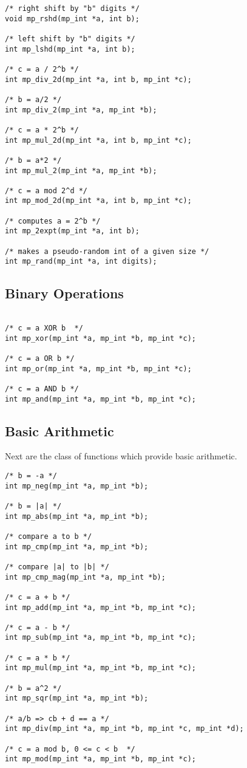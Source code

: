 \documentclass[]{article}
\begin{document}
\begin{verbatim}
/* right shift by "b" digits */
void mp_rshd(mp_int *a, int b);

/* left shift by "b" digits */
int mp_lshd(mp_int *a, int b);

/* c = a / 2^b */
int mp_div_2d(mp_int *a, int b, mp_int *c);

/* b = a/2 */
int mp_div_2(mp_int *a, mp_int *b);

/* c = a * 2^b */
int mp_mul_2d(mp_int *a, int b, mp_int *c);

/* b = a*2 */
int mp_mul_2(mp_int *a, mp_int *b);

/* c = a mod 2^d */
int mp_mod_2d(mp_int *a, int b, mp_int *c);

/* computes a = 2^b */
int mp_2expt(mp_int *a, int b);

/* makes a pseudo-random int of a given size */
int mp_rand(mp_int *a, int digits);

\end{verbatim}

\subsection{Binary Operations}

\begin{verbatim}

/* c = a XOR b  */
int mp_xor(mp_int *a, mp_int *b, mp_int *c);

/* c = a OR b */
int mp_or(mp_int *a, mp_int *b, mp_int *c);

/* c = a AND b */
int mp_and(mp_int *a, mp_int *b, mp_int *c);

\end{verbatim}

\subsection{Basic Arithmetic}

Next are the class of functions which provide basic arithmetic.

\begin{verbatim}
/* b = -a */
int mp_neg(mp_int *a, mp_int *b);

/* b = |a| */
int mp_abs(mp_int *a, mp_int *b);

/* compare a to b */
int mp_cmp(mp_int *a, mp_int *b);

/* compare |a| to |b| */
int mp_cmp_mag(mp_int *a, mp_int *b);

/* c = a + b */
int mp_add(mp_int *a, mp_int *b, mp_int *c);

/* c = a - b */
int mp_sub(mp_int *a, mp_int *b, mp_int *c);

/* c = a * b */
int mp_mul(mp_int *a, mp_int *b, mp_int *c);

/* b = a^2 */
int mp_sqr(mp_int *a, mp_int *b);

/* a/b => cb + d == a */
int mp_div(mp_int *a, mp_int *b, mp_int *c, mp_int *d);

/* c = a mod b, 0 <= c < b  */
int mp_mod(mp_int *a, mp_int *b, mp_int *c);
\end{verbatim}
\end{document}
